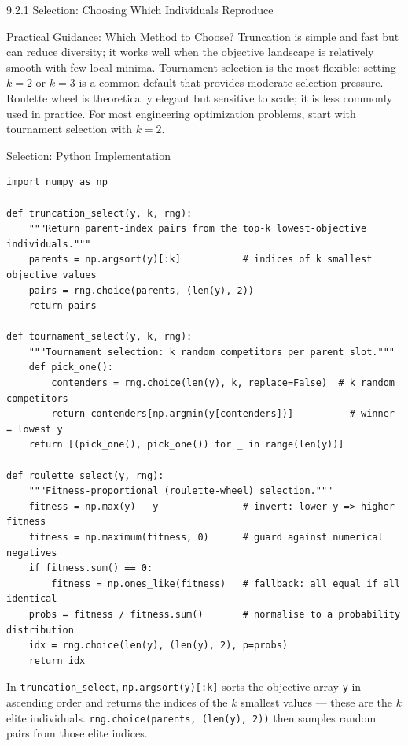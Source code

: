\documentclass[aspectratio=169,10pt]{beamer}
\begin{document}
\begin{frame}[allowframebreaks]{9.2.1 Selection: Choosing Which Individuals Reproduce}
  \begin{alertblock}{Practical Guidance: Which Method to Choose?}
    Truncation is simple and fast but can reduce diversity; it works
    well when the objective landscape is relatively smooth with few
    local minima.  Tournament selection is the most flexible: setting
    $k = 2$ or $k = 3$ is a common default that provides moderate
    selection pressure.  Roulette wheel is theoretically elegant but
    sensitive to scale; it is less commonly used in practice.  For
    most engineering optimization problems, start with tournament
    selection with $k = 2$.
  \end{alertblock}

\end{frame}

\begin{frame}[fragile]{Selection: Python Implementation}
\begin{lstlisting}[style=python, caption={Three selection methods (Python / NumPy)}]
import numpy as np

def truncation_select(y, k, rng):
    """Return parent-index pairs from the top-k lowest-objective individuals."""
    parents = np.argsort(y)[:k]           # indices of k smallest objective values
    pairs = rng.choice(parents, (len(y), 2))
    return pairs

def tournament_select(y, k, rng):
    """Tournament selection: k random competitors per parent slot."""
    def pick_one():
        contenders = rng.choice(len(y), k, replace=False)  # k random competitors
        return contenders[np.argmin(y[contenders])]          # winner = lowest y
    return [(pick_one(), pick_one()) for _ in range(len(y))]

def roulette_select(y, rng):
    """Fitness-proportional (roulette-wheel) selection."""
    fitness = np.max(y) - y               # invert: lower y => higher fitness
    fitness = np.maximum(fitness, 0)      # guard against numerical negatives
    if fitness.sum() == 0:
        fitness = np.ones_like(fitness)   # fallback: all equal if all identical
    probs = fitness / fitness.sum()       # normalise to a probability distribution
    idx = rng.choice(len(y), (len(y), 2), p=probs)
    return idx
\end{lstlisting}

  In \texttt{truncation\_select}, \texttt{np.argsort(y)[:k]} sorts
  the objective array \texttt{y} in ascending order and returns the
  indices of the $k$ smallest values --- these are the $k$ elite
  individuals.  \texttt{rng.choice(parents, (len(y), 2))} then
  samples random pairs from those elite indices.


\end{frame}
\end{document}
